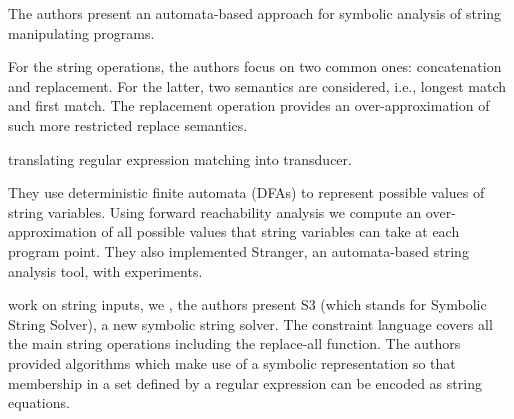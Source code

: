 

\cite{YABI14} %
The authors present an automata-based approach for symbolic analysis of string manipulating programs. 

For the string operations, the authors focus on two common ones: concatenation and replacement. For the latter, two semantics are considered, i.e., longest match and first match. The replacement operation provides an over-approximation of such more restricted replace semantics. 

\cite{SMV12} translating regular expression matching into transducer. 

They use deterministic finite automata (DFAs) to represent possible values of string variables. Using forward reachability analysis we compute an over-approximation of all possible values that string variables can take at each program point. They also implemented Stranger, an automata-based string analysis tool, with experiments. 


work on string inputs, we 
\cite{TCJ14}, the authors present S3 (which stands for Symbolic String Solver), a new symbolic string solver.
The constraint language covers all the main string operations including the replace-all function. The authors 
provided algorithms which make use of a symbolic representation so that membership in a set defined by a regular expression can be encoded as string equations. 

